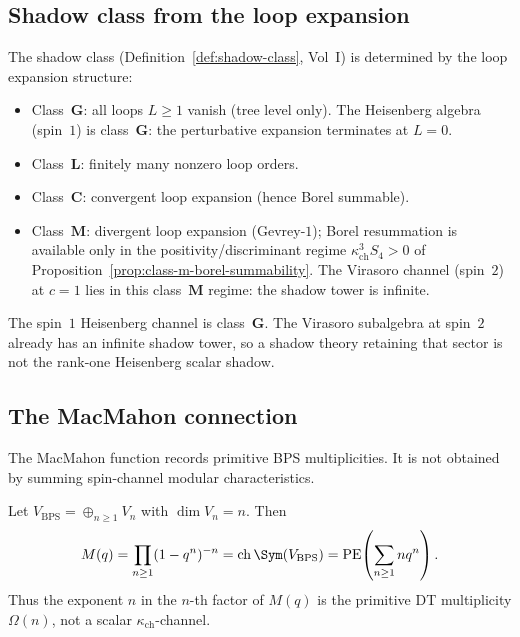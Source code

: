 \subsection{Shadow class from the loop expansion}
\label{subsec:shadow-class-loops}

The shadow class (Definition~\ref{def:shadow-class}, Vol~I) is determined by the loop expansion structure:
\begin{itemize}
 \item Class~$\mathbf{G}$: all loops $L \geq 1$ vanish (tree level only). The Heisenberg algebra (spin~$1$) is class~$\mathbf{G}$: the perturbative expansion terminates at $L = 0$.
 \item Class~$\mathbf{L}$: finitely many nonzero loop orders.
 \item Class~$\mathbf{C}$: convergent loop expansion (hence Borel summable).
 \item Class~$\mathbf{M}$: divergent loop expansion (Gevrey-$1$); Borel resummation is available only in the positivity/discriminant regime $\kappa_{\mathrm{ch}}^3S_4>0$ of Proposition~\ref{prop:class-m-borel-summability}. The Virasoro channel (spin~$2$) at $c = 1$ lies in this class~$\mathbf{M}$ regime: the shadow tower is infinite.
\end{itemize}

The spin~\(1\) Heisenberg channel is class~\(\mathbf{G}\). The
Virasoro subalgebra at spin~\(2\) already has an infinite shadow tower,
so a shadow theory retaining that sector is not the rank-one Heisenberg
scalar shadow.

\subsection{The MacMahon connection}
\label{subsec:macmahon-connection-feynman}

The MacMahon function records primitive BPS multiplicities. It is not
obtained by summing spin-channel modular characteristics.

\begin{proposition}
\label{prop:constant-effective-kappa}
\ClaimStatusProvedHere
Let \(V_{\mathrm{BPS}}=\oplus_{n\geq 1}V_n\) with \(\dim V_n=n\).
Then
\[
 M(q)=\prod_{n\geq 1}(1-q^n)^{-n}
 =\mathrm{ch}\,\Sym(V_{\mathrm{BPS}})
 =\operatorname{PE}\!\left(\sum_{n\geq 1}nq^n\right).
\]
Thus the exponent \(n\) in the \(n\)-th factor of \(M(q)\) is the
primitive DT multiplicity \(\Omega(n)\), not a scalar
\(\kappa_{\mathrm{ch}}\)-channel.
\end{proposition}

